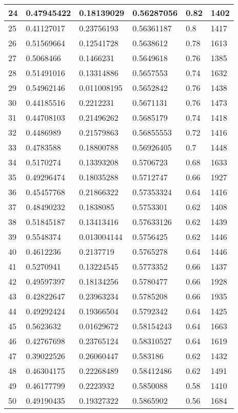 \begin{longtable}{|l|l|l|l|l|l|}
24 & 0.47945422 & 0.18139029 & 0.56287056 & 0.82 & 1402 \\ \hline 
25 & 0.41127017 & 0.23756193 & 0.56361187 & 0.8 & 1417 \\ \hline 
26 & 0.51569664 & 0.12541728 & 0.5638612 & 0.78 & 1613 \\ \hline 
27 & 0.5068466 & 0.1466231 & 0.5649618 & 0.76 & 1385 \\ \hline 
28 & 0.51491016 & 0.13314886 & 0.5657553 & 0.74 & 1632 \\ \hline 
29 & 0.54962146 & 0.011008195 & 0.5652842 & 0.76 & 1438 \\ \hline 
30 & 0.44185516 & 0.2212231 & 0.5671131 & 0.76 & 1473 \\ \hline 
31 & 0.44708103 & 0.21496262 & 0.5685179 & 0.74 & 1418 \\ \hline 
32 & 0.4486989 & 0.21579863 & 0.56855553 & 0.72 & 1416 \\ \hline 
33 & 0.4783588 & 0.18800788 & 0.56926405 & 0.7 & 1448 \\ \hline 
34 & 0.5170274 & 0.13393208 & 0.5706723 & 0.68 & 1633 \\ \hline 
35 & 0.49296474 & 0.18035288 & 0.5712747 & 0.66 & 1927 \\ \hline 
36 & 0.45457768 & 0.21866322 & 0.57353324 & 0.64 & 1416 \\ \hline 
37 & 0.48490232 & 0.1838085 & 0.5753301 & 0.62 & 1408 \\ \hline 
38 & 0.51845187 & 0.13413416 & 0.57633126 & 0.62 & 1439 \\ \hline 
39 & 0.5548374 & 0.013004144 & 0.5756425 & 0.62 & 1446 \\ \hline 
40 & 0.4612236 & 0.2137719 & 0.5765278 & 0.64 & 1446 \\ \hline 
41 & 0.5270941 & 0.13224545 & 0.5773352 & 0.66 & 1437 \\ \hline 
42 & 0.49597397 & 0.18134256 & 0.5780477 & 0.66 & 1928 \\ \hline 
43 & 0.42822647 & 0.23963234 & 0.5785208 & 0.66 & 1935 \\ \hline 
44 & 0.49292424 & 0.19366504 & 0.5792342 & 0.64 & 1425 \\ \hline 
45 & 0.5623632 & 0.01629672 & 0.58154243 & 0.64 & 1663 \\ \hline 
46 & 0.42767698 & 0.23765124 & 0.58310527 & 0.64 & 1619 \\ \hline 
47 & 0.39022526 & 0.26060447 & 0.583186 & 0.62 & 1432 \\ \hline 
48 & 0.46304175 & 0.22268489 & 0.58412486 & 0.62 & 1491 \\ \hline 
49 & 0.46177799 & 0.2223932 & 0.5850088 & 0.58 & 1410 \\ \hline 
50 & 0.49190435 & 0.19327322 & 0.5865902 & 0.56 & 1684 \\ \hline 
\end{longtable}